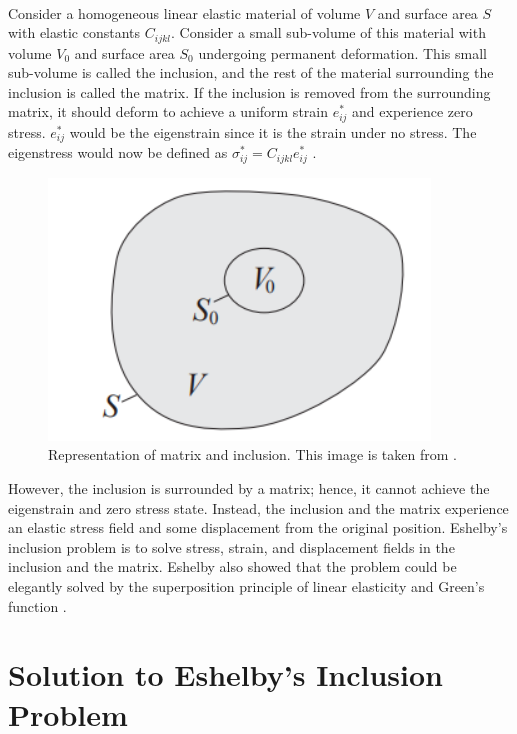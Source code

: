 \documentclass[12pt, a4paper]{report}
\begin{document}
\paragraph{}
Consider a homogeneous linear elastic material of volume $V$ and surface area $S$ with elastic constants $C_{ijkl}$. Consider a small sub-volume of this material with volume $V_{0}$ and surface area $S_{0}$ undergoing permanent deformation. This small sub-volume is called the inclusion, and the rest of the material surrounding the inclusion is called the matrix. If the inclusion is removed from the surrounding matrix, it should deform to achieve a uniform strain $e^{*}_{ij}$ and experience zero stress. $e^{*}_{ij}$ would be the eigenstrain since it is the strain under no stress. The eigenstress would now be defined as $\sigma^{*}_{ij} = C_{ijkl}e^{*}_{ij}$ \cite{stanford_notes}.

\begin{figure}[h]
   \centering
   \includegraphics [height=2 in]{eigstress1}
   \caption{Representation of matrix and inclusion. This image is taken from \cite{stanford_notes}.}
   \label{fig:eigstress1}
\end{figure}

However, the inclusion is surrounded by a matrix; hence, it cannot achieve the eigenstrain and zero stress state. Instead, the inclusion and the matrix experience an elastic stress field and some displacement from the original position. Eshelby’s inclusion problem is to solve stress, strain, and displacement fields in the inclusion and the matrix. Eshelby also showed that the problem could be elegantly solved by the superposition principle of linear elasticity and Green’s function \cite{stanford_notes}.

\section{Solution to Eshelby's Inclusion Problem}
\end{document}
